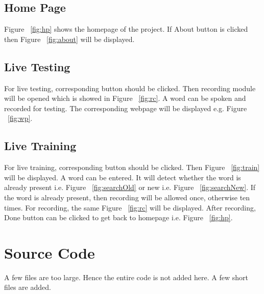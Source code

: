 \documentclass{article}
\begin{document}
\subsection{Home Page}
Figure ~\ref{fig:hp} shows the homepage of the project. If About button is clicked then Figure ~\ref{fig:about} will be displayed.

\subsection{Live Testing}
For live testing, corresponding button should be clicked. Then recording module will be opened which is showed in Figure ~\ref{fig:rc}. A word can be spoken and recorded for testing. The corresponding webpage will be displayed e.g. Figure ~\ref{fig:wp}.

\subsection{Live Training}
For live training, corresponding button should be clicked. Then Figure ~\ref{fig:train} will be displayed. A word can be entered. It will detect whether the word is already present i.e. Figure ~\ref{fig:searchOld} or new i.e. Figure ~\ref{fig:searchNew}. If the word is already present, then recording will be allowed once, otherwise ten times. For recording, the same Figure ~\ref{fig:rc} will be displayed. After recording, Done button can be clicked to get back to homepage i.e. Figure ~\ref{fig:hp}.

\section{Source Code}
A few files are too large. Hence the entire code is not added here. A few short files are added.
\end{document}
